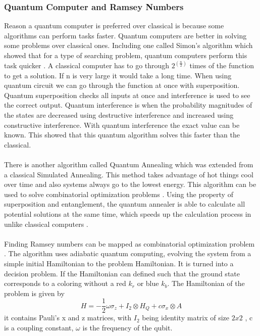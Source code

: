 \documentclass{Assignment}
\begin{document}
\subsubsection*{Quantum Computer and Ramsey Numbers}
Reason a quantum computer is preferred over classical is because some algorithms can perform tasks faster. 
Quantum computers are better in solving some problems over classical ones.
Including one called Simon's algorithm which showed that for a type of searching problem, quantum computers perform this task quicker \cite{doi:10.1137/S0097539796298637}.
A classical computer has to go through $ 2^{\left(\frac{n}{2}\right)}$ times of the function to get a solution.
If n is very large it would take a long time.
When using quantum circuit we can go through the function at once with superposition.
Quantum superposition checks all inputs at once and interference is used to see the correct output.
Quantum interference is when the probability magnitudes of the states are decreased using destructive interference and increased using constructive interference.
With quantum interference the exact value can be known.
This showed that this quantum algorithm solves this faster than the classical. 
\\\\
There is another algorithm called Quantum Annealing which was extended from a classical Simulated Annealing.
This method takes advantage of hot things cool over time and also systems always go to the lowest energy.
This algorithm can be used to solve combinatorial optimization problems \cite{AndrewSteane}.
Using the property of superposition and entanglement, the quantum annealer is able to calculate all potential solutions at the same time, which speeds up the 
calculation process in unlike classical 
computers \cite{AndrewSteane}.
\\\\
Finding Ramsey numbers can be mapped as combinatorial optimization problem \cite{PhysRevA.93.032301}.
The algorithm uses adiabatic quantum computing, evolving the system from a simple initial Hamiltonian to the problem Hamiltonian.
It is turned into a decision problem.
If the Hamiltonian can defined such that the ground state corresponds to a coloring without a red $k_r$ or blue $k_b$.
The Hamiltonian of the problem is given by
\begin{equation}
	H = -\frac{1}{2}\omega \sigma_z + I_2 \otimes H_Q+c\sigma_x\otimes A
	\label{hamiltonian}
\end{equation}
it contains Pauli's x and z matrices, with $I_2$ being identity matrix of size $2 x 2$ , c is a coupling constant, $\omega$ is the frequency of the qubit.
\end{document}
